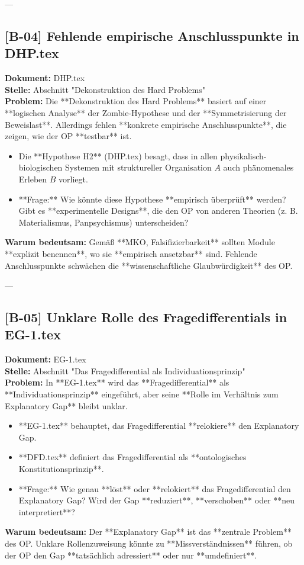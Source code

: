 \documentclass[11pt,a4paper]{article}
\begin{document}
---
\subsection*{[B-04] Fehlende empirische Anschlusspunkte in DHP.tex}
\textbf{Dokument:} DHP.tex \\
\textbf{Stelle:} Abschnitt "Dekonstruktion des Hard Problems" \\
\textbf{Problem:}
Die **Dekonstruktion des Hard Problems** basiert auf einer **logischen Analyse** der Zombie-Hypothese und der **Symmetrisierung der Beweislast**. Allerdings fehlen **konkrete empirische Anschlusspunkte**, die zeigen, wie der OP **testbar** ist.
\begin{itemize}
    \item Die **Hypothese H2** (DHP.tex) besagt, dass in allen physikalisch-biologischen Systemen mit struktureller Organisation $A$ auch phänomenales Erleben $B$ vorliegt.
    \item **Frage:** Wie könnte diese Hypothese **empirisch überprüft** werden? Gibt es **experimentelle Designs**, die den OP von anderen Theorien (z. B. Materialismus, Panpsychismus) unterscheiden?
\end{itemize}
\textbf{Warum bedeutsam:}
Gemäß **MKO, Falsifizierbarkeit** sollten Module **explizit benennen**, wo sie **empirisch ansetzbar** sind. Fehlende Anschlusspunkte schwächen die **wissenschaftliche Glaubwürdigkeit** des OP.

---
\subsection*{[B-05] Unklare Rolle des Fragedifferentials in EG-1.tex}
\textbf{Dokument:} EG-1.tex \\
\textbf{Stelle:} Abschnitt "Das Fragedifferential als Individuationsprinzip" \\
\textbf{Problem:}
In **EG-1.tex** wird das **Fragedifferential** als **Individuationsprinzip** eingeführt, aber seine **Rolle im Verhältnis zum Explanatory Gap** bleibt unklar.
\begin{itemize}
    \item **EG-1.tex** behauptet, das Fragedifferential **relokiere** den Explanatory Gap.
    \item **DFD.tex** definiert das Fragedifferential als **ontologisches Konstitutionsprinzip**.
    \item **Frage:** Wie genau **löst** oder **relokiert** das Fragedifferential den Explanatory Gap? Wird der Gap **reduziert**, **verschoben** oder **neu interpretiert**?
\end{itemize}
\textbf{Warum bedeutsam:}
Der **Explanatory Gap** ist das **zentrale Problem** des OP. Unklare Rollenzuweisung könnte zu **Missverständnissen** führen, ob der OP den Gap **tatsächlich adressiert** oder nur **umdefiniert**.
\end{document}
